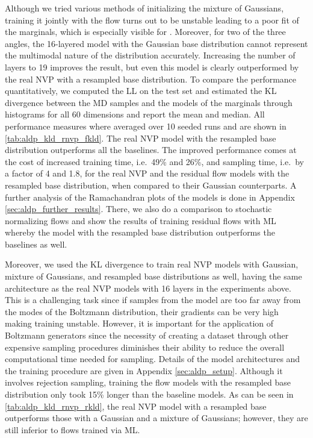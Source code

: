 \documentclass[twoside]{article}
\begin{document}
Although we tried various methods of initializing the mixture of Gaussians, training it jointly with the flow turns out to be unstable leading to a poor fit of the marginals, which is especially visible for . Moreover, for two of the three angles, the 16-layered model with the Gaussian base distribution cannot represent the multimodal nature of the distribution accurately. Increasing the number of layers to 19 improves the result, but even this model is clearly outperformed by the real NVP with a resampled base distribution. To compare the performance quantitatively, we computed the LL on the test set and estimated the KL divergence between the MD samples and the models of the marginals through histograms for all 60 dimensions and report the mean and median. All performance measures where averaged over 10 seeded runs and are shown in \autoref{tab:aldp_kld_rnvp_fkld}. The real NVP model with the resampled base distribution outperforms all the baselines. The improved performance comes at the cost of increased training time, i.e.\ 49\% and 26\%, and sampling time, i.e.\ by a factor of 4 and 1.8, for the real NVP and the residual flow models with the resampled base distribution, when compared to their Gaussian counterparts. A further analysis of the Ramachandran plots of the models is done in Appendix \ref{sec:aldp_further_results}. There, we also do a comparison to stochastic normalizing flows \citep{Wu2020} and show the results of training residual flows with ML whereby the model with the resampled base distribution outperforms the baselines as well.

Moreover, we used the KL divergence to train real NVP models with Gaussian, mixture of Gaussians, and resampled base distributions as well, having the same architecture as the real NVP models with 16 layers in the experiments above. This is a challenging task since if samples from the model are too far away from the modes of the Boltzmann distribution, their gradients can be very high making training unstable. However, it is important for the application of Boltzmann generators since the necessity of creating a dataset through other expensive sampling procedures diminishes their ability to reduce the overall computational time needed for sampling. Details of the model architectures and the training procedure are given in Appendix \ref{sec:aldp_setup}. Although it involves rejection sampling, training the flow models with the resampled base distribution only took 15\% longer than the baseline models. As can be seen in \autoref{tab:aldp_kld_rnvp_rkld}, the real NVP model with a resampled base outperforms those with a Gaussian and a mixture of Gaussians; however, they are still inferior to flows trained via ML.
\end{document}
